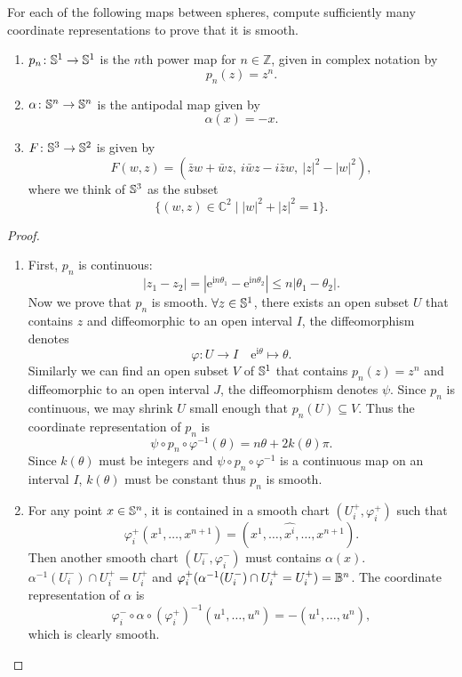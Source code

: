 \begin{problem}
    For each of the following maps between spheres, compute sufficiently many coordinate representations to prove that it is smooth.
    \begin{enumerate}
        \item $p_n \colon \mathbb{S}^1 \to \mathbb{S}^1$ is the $n$th power map for $n \in \mathbb{Z}$, given in complex notation by
        \[
            p_n(z) = z^n.
        \]
        \item $\alpha \colon \mathbb{S}^n \to \mathbb{S}^n$ is the antipodal map given by
        \[
            \alpha(x) = -x.
        \]
        \item $F \colon \mathbb{S}^3 \to \mathbb{S}^2$ is given by
        \[
            F(w, z) = (\bar{z}w + \bar{w}z,\ i\bar{w}z - i\bar{z}w,\ |z|^2 - |w|^2),
        \]
        where we think of $\mathbb{S}^3$ as the subset
        \[
            \{(w, z) \in \mathbb{C}^2 \mid |w|^2 + |z|^2 = 1\}.
        \]
    \end{enumerate}

    \begin{proof}
        \begin{enumerate}
            \item First, $p_n$ is continuous:
            $$ 
            |z_1 - z_2| = |\mathrm{e}^{\mathrm{i}n\theta_1} - \mathrm{e}^{\mathrm{i}n\theta_2}| \leq n|\theta_1 - \theta_2|.
            $$
            Now we prove that $p_n$ is smooth. $\forall z \in \mathbb{S}^1$, there exists an open subset $U$ that contains $z$ and diffeomorphic to an open interval $I$, the diffeomorphism denotes 
            $$ 
            \varphi \colon U \to I \quad \mathrm{e}^{\mathrm{i}\theta} \mapsto \theta.
            $$
            Similarly we can find an open subset $V$ of $\mathbb{S}^1$ that contains $p_n(z) = z^n$ and diffeomorphic to an open interval $J$, the diffeomorphism denotes $\psi$. Since $p_n$ is continuous, we may shrink $U$ small enough that $p_n(U) \subseteq V$. Thus the coordinate representation of $p_n$ is 
            $$ 
            \psi \circ p_n \circ \varphi^{-1}(\theta) = n\theta + 2k(\theta)\pi.
            $$
            Since $k(\theta)$ must be integers and $\psi \circ p_n \circ \varphi^{-1}$ is a continuous map on an interval $I$, $k(\theta)$ must be constant thus $p_n$ is smooth.

            \item For any point $x\in \mathbb{S}^n$, it is contained in a smooth chart $(U_i^+, \varphi_i^+)$ such that 
            $$ \varphi_i^+(x^1, \dots, x^{n+1}) = (x^1, \dots, \widehat{x^i}, \dots, x^{n+1}).$$
            Then another smooth chart $(U_i^-, \varphi_i^-)$ must contains $\alpha(x)$. $\alpha^{-1}(U_i^-) \cap U_i^+ = U_i^+$ and $\varphi_i^+(\alpha^{-1}(U_i^-) \cap U_i^+ = U_i^+)=\mathbb{B}^n$. The coordinate representation of $\alpha$ is 
            $$\varphi_i^- \circ \alpha \circ (\varphi_i^+)^{-1}(u^1, \dots, u^n) = -(u^1, \dots, u^n),$$
            which is clearly smooth.


\end{enumerate}
\end{proof}
\end{problem}
